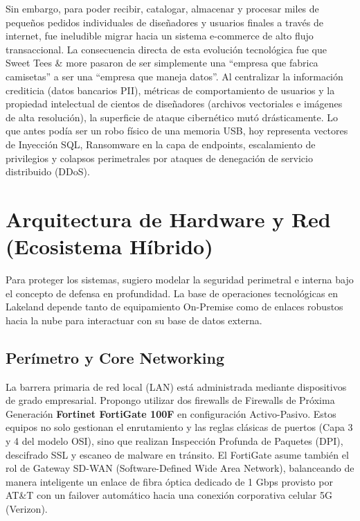 \documentclass[11pt,a4paper]{article}
\begin{document}
Sin embargo, para poder recibir, catalogar, almacenar y procesar miles de pequeños pedidos individuales de diseñadores y usuarios finales a través de internet, fue ineludible migrar hacia un sistema e-commerce de alto flujo transaccional. La consecuencia directa de esta evolución tecnológica fue que Sweet Tees \& more pasaron de ser simplemente una \enquote{empresa que fabrica camisetas} a ser una \enquote{empresa que maneja datos}. Al centralizar la información crediticia (datos bancarios PII), métricas de comportamiento de usuarios y la propiedad intelectual de cientos de diseñadores (archivos vectoriales e imágenes de alta resolución), la superficie de ataque cibernético mutó drásticamente. Lo que antes podía ser un robo físico de una memoria USB, hoy representa vectores de Inyección SQL, Ransomware en la capa de endpoints, escalamiento de privilegios y colapsos perimetrales por ataques de denegación de servicio distribuido (DDoS).

\section{Arquitectura de Hardware y Red (Ecosistema Híbrido)}

Para proteger los sistemas, sugiero modelar la seguridad perimetral e interna bajo el concepto de defensa en profundidad. La base de operaciones tecnológicas en Lakeland depende tanto de equipamiento On-Premise como de enlaces robustos hacia la nube para interactuar con su base de datos externa.

\subsection{Perímetro y Core Networking}
La barrera primaria de red local (LAN) está administrada mediante dispositivos de grado empresarial. Propongo utilizar dos firewalls de Firewalls de Próxima Generación \textbf{Fortinet FortiGate 100F} en configuración Activo-Pasivo. Estos equipos no solo gestionan el enrutamiento y las reglas clásicas de puertos (Capa 3 y 4 del modelo OSI), sino que realizan Inspección Profunda de Paquetes (DPI), descifrado SSL y escaneo de malware en tránsito. El FortiGate asume también el rol de Gateway SD-WAN (Software-Defined Wide Area Network), balanceando de manera inteligente un enlace de fibra óptica dedicado de 1 Gbps provisto por AT\&T con un failover automático hacia una conexión corporativa celular 5G (Verizon).
\end{document}
